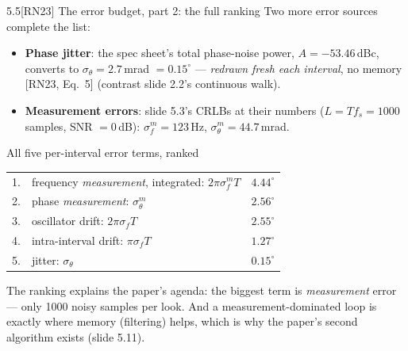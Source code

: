\documentclass[10pt]{beamer}
\newcommand{\RN}[1]{\textcolor{blue!50!black}{[RN23#1]}}
\newcommand{\srcline}[1]{\par\vfill\noindent{\tiny\textcolor{gray}{Source: #1}}}
\begin{document}
\begin{frame}{5.5\quad \RN{} The error budget, part 2: the full ranking}
\small
Two more error sources complete the list:
\begin{itemize}
\item \textbf{Phase jitter}: the spec sheet's total phase-noise power,
$A=-53.46$\,dBc, converts to $\sigma_\theta=2.7$\,mrad $=0.15^\circ$
--- \emph{redrawn fresh each interval}, no memory \RN{, Eq.~5}
(contrast slide 2.2's continuous walk).
\item \textbf{Measurement errors}: slide 5.3's CRLBs at their numbers
($L=Tf_s=1000$ samples, SNR $=0$\,dB): $\sigma^m_f=123$\,Hz,
$\sigma^m_\theta=44.7$\,mrad.
\end{itemize}
\begin{block}{All five per-interval error terms, ranked}
\centering
\begin{tabular}{llc}
1. & frequency \emph{measurement}, integrated: $2\pi\sigma^m_fT$ & $4.44^\circ$\\
2. & phase \emph{measurement}: $\sigma^m_\theta$ & $2.56^\circ$\\
3. & oscillator drift: $2\pi\sigma_fT$ & $2.55^\circ$\\
4. & intra-interval drift: $\pi\sigma_fT$ & $1.27^\circ$\\
5. & jitter: $\sigma_\theta$ & $0.15^\circ$\\
\end{tabular}
\end{block}
The ranking explains the paper's agenda: the biggest term is
\emph{measurement} error --- only 1000 noisy samples per look. And a
measurement-dominated loop is exactly where memory (filtering) helps,
which is why the paper's second algorithm exists (slide 5.11).
\srcline{[RN23] Eqs.~5, 16--17; numerical evaluation: this deck.}
\end{frame}
\end{document}
